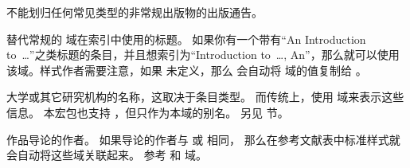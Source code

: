 \begin{fieldlist}



不能划归任何常见类型的非常规出版物的出版通告。



替代常规的  域在索引中使用的标题。
如果你有一个带有“An Introduction to~\dots”之类标题的条目，并且想索引为“Introduction to~\dots, An”，那么就可以使用该域。样式作者需要注意，如果  未定义，那么 \biblatex 会自动将  域的值复制给 。




大学或其它研究机构的名称，这取决于条目类型。
而传统上，\BibTeX 使用  域来表示这些信息。
本宏包也支持 ，但只作为本域的别名。
另见  节。




作品导论的作者。
如果导论的作者与  或  相同，
那么在参考文献表中标准样式就会自动将这些域关联起来。
参考  和  域。


\end{fieldlist}
